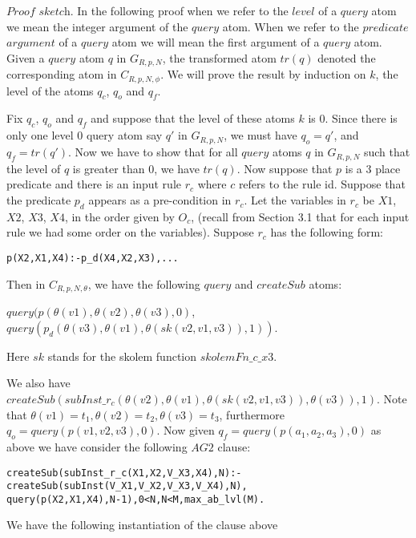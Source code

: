 \documentclass[sigconf]{acmart}
\begin{document}
$\textit{Proof sketch}$. In the following proof when we refer to the $level$ of a $query$ atom we mean the integer argument of the $query$ atom. When we refer to the $predicate$ $argument$ of a $query$ atom we will mean the first argument of a $query$ atom. Given a $query$ atom $q$ in $G_{R,p,N}$, the transformed atom $tr(q)$ denoted the corresponding atom in $C_{R,p,N,\phi}$. We will prove the result by induction on $k$, the level of the atoms $q_{c}$, $q_{o}$ and $q_{f}$. 

Fix $q_{c}$, $q_{o}$ and $q_{f}$ and suppose that the level of these atoms $k$ is $0$. Since there is only one level $0$ query atom say $q'$ in $G_{R,p,N}$, we must have $q_{o}=q'$, and $q_{f} = tr(q')$. Now we have to show that for all $query$ atoms $q$ in $G_{R,p,N}$ such that the level of $q$ is greater than $0$, we have $tr(q)$. Now suppose that $p$ is a 3 place predicate and there is an input rule $r_{c}$ where ${c}$ refers to the rule id. Suppose that the predicate $p_{d}$ appears as a pre-condition in $r_{c}$. Let the variables in $r_{c}$ be $X1$, $X2$, $X3$, $X4$, in the order given by $O_{c}$, (recall from Section 3.1 that for each input rule we had some order on the variables). Suppose $r_{c}$ has the following form:
\begin{verbatim}
p(X2,X1,X4):-p_d(X4,X2,X3),...    
\end{verbatim}

Then in $C_{R,p,N,\theta}$, we have the following $query$ and $createSub$ atoms:

$query(p(\theta(v1),\theta(v2),\theta(v3),0)$, $query(p_{d}(\theta(v3),\theta(v1),\theta(sk(v2,v1,v3)),1))$. 

Here $sk$ stands for the skolem function $skolemFn\_c\_x3$. 

We also have $createSub(subInst\_r_{c}(\theta(v2),\theta(v1),\theta(sk(v2,v1,v3)), \theta(v3)),1)$. Note that $\theta(v1)=t_{1},\theta(v2)=t_{2},\theta(v3)=t_{3}$, furthermore $q_{o}= query(p(v1,v2,v3),0)$. Now given $q_{f} = query(p(a_{1},a_{2},a_{3}),0)$ as above we have consider the following $AG2$ clause:
\begin{verbatim}
createSub(subInst_r_c(X1,X2,V_X3,X4),N):-createSub(subInst(V_X1,V_X2,V_X3,V_X4),N),
query(p(X2,X1,X4),N-1),0<N,N<M,max_ab_lvl(M).    
\end{verbatim}
We have the following instantiation of the clause above
\end{document}
